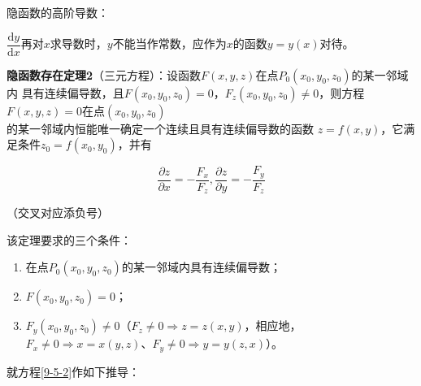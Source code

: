 \documentclass[12pt, a4paper]{article}
\numberwithin{equation}{section}
\newcommand{\rmd}{\mathrm{d}}
\begin{document}
    隐函数的高阶导数：

    \(\dfrac{\rmd y}{\rmd x}\)再对\(x\)求导数时，\(y\)不能当作常数，应作为\(x\)的函数\(y=y(x)\)对待。

    \vspace{1em}
    \textbf{隐函数存在定理2}（三元方程）：设函数\(F\left(x,y,z\right)\)在点\(P_0\left(x_0,y_0,z_0\right)\)的某一邻域内
    具有连续偏导数，且\(F\left(x_0,y_0,z_0\right)=0\)，\(F_z\left(x_0,y_0,z_0\right)\neq0\)，则方程
    \(F\left(x,y,z\right)=0\)在点\(\left(x_0,y_0,z_0\right)\)\\的某一邻域内恒能唯一确定一个连续且具有连续偏导数的函数
    \(z=f\left(x,y\right)\)，它满足条件\(z_0=f\left(x_0,y_0\right)\)，并有

    \begin{equation}
        \frac{\partial z}{\partial x}=-\frac{F_x}{F_z}, \frac{\partial z}{\partial y}=-\frac{F_y}{F_z}
        \label{9-5-2}
    \end{equation}

    （交叉对应添负号）

    该定理要求的三个条件：

    \begin{enumerate}
        \item 在点\(P_0\left(x_0,y_0,z_0\right)\)的某一邻域内具有连续偏导数；
        \item \(F\left(x_0,y_0,z_0\right)=0\)；
        \item \(F_y\left(x_0,y_0,z_0\right)\neq0\)（\(F_z \neq 0 \Rightarrow z = z(x,y)\)，相应地，
            \(F_x \neq 0 \Rightarrow x = x(y,z)\)、\(F_y \neq 0 \Rightarrow y = y(z,x)\)）。
    \end{enumerate}

    就方程\ref{9-5-2}作如下推导：
    
\end{document}
